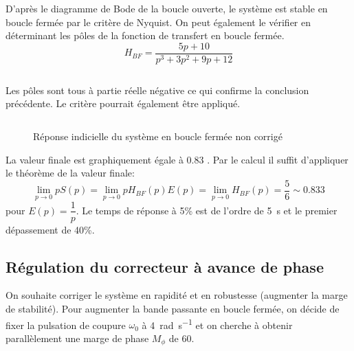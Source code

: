D'après le diagramme de Bode de la boucle ouverte, le système est stable 
en boucle fermée par le critère de Nyquist. On peut également le vérifier 
en déterminant les pôles de la fonction de transfert en boucle fermée.
\[
    H_{BF}=\dfrac{5p+10}{p^3+3p^2+9p+12}
\]
\inputminted{scilab}{codes/scilab/code_q3_chap_correction.sce}
Les pôles sont tous à partie réelle négative ce qui confirme la conclusion 
précédente. Le critère pourrait également être appliqué.
\inputminted{scilab}{codes/scilab/code_q4_chap_correction.sce}
\begin{figure}
    \centering
{}
    
    \caption{Réponse indicielle du système en boucle fermée non corrigé}
\end{figure}
La valeur finale est graphiquement égale à 0.83 .
Par le calcul il suffit d'appliquer le théorème de la valeur finale:
\[
    \lim\limits_{p\to0} pS(p)=
    \lim\limits_{p\to0} pH_{BF}(p)E(p)=
    \lim\limits_{p\to0} H_{BF}(p)=\dfrac{5}{6}\sim0.833
\]
pour $E(p)=\dfrac{1}{p}$.
Le temps de réponse à 5\% est de l'ordre de \SI{5}{\second} et le premier 
dépassement de 40\%.
\subsection*{Régulation du correcteur à avance de phase}
On souhaite corriger le système en rapidité et en robustesse (augmenter la 
marge de stabilité). Pour augmenter la bande passante en boucle fermée, on 
décide de fixer la pulsation de coupure $\omega_0$ à 
\SI{4}{\radian\per\second} et on cherche à obtenir parallèlement une marge 
de phase $M_\phi$ de \SI{60}{\degreeSI}.

